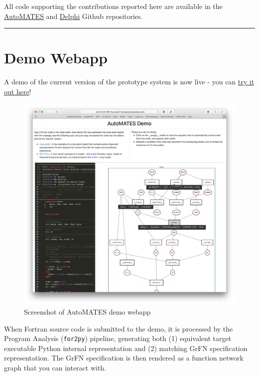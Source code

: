 \documentclass[article, 12pt, oneside]{memoir}
\begin{document}
All code supporting the contributions reported here are available in the
\href{https://github.com/ml4ai/automates}{AutoMATES} and
\href{https://github.com/ml4ai/delphi/}{Delphi} Github repositories.

\begin{center}\rule{0.5\linewidth}{\linethickness}\end{center}

\hypertarget{demo-webapp}{%
\section{Demo Webapp}\label{demo-webapp}}

A demo of the current version of the prototype system is now live - you
can \href{http://ec2-13-57-207-3.us-west-1.compute.amazonaws.com}{try it
out here}!

\begin{figure}
\centering
\includegraphics{figs/webapp_screenshot.png}
\caption{Screenshot of AutoMATES demo webapp}
\end{figure}

When Fortran source code is submitted to the demo, it is processed by
the Program Analysis (\texttt{for2py}) pipeline, generating both (1)
equivalent target executable Python internal representation and (2)
matching GrFN specification representation. The GrFN specification is
then rendered as a function network graph that you can interact with.
\end{document}
